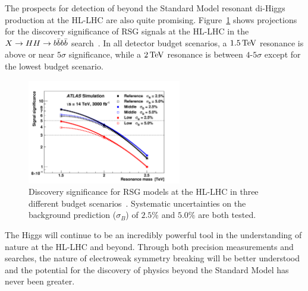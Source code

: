 The prospects for detection of beyond the Standard Model resonant di-Higgs production at the HL-LHC are also quite promising. Figure~\ref{fig:HH_prospect} shows projections for the discovery significance of RSG signals at the HL-LHC in the $X\to HH \to b\bar{b}b\bar{b}$ search~\cite{ScopingDocument}. In all detector budget scenarios, a $1.5 \TeV$ resonance is above or near $5\sigma$ significance, while a $2 \TeV$ resonance is between $4$-$5\sigma$ except for the lowest budget scenario. 
%
\begin{figure}[h!]
  \centering
  \captionsetup{justification=centering}

  \includegraphics[width=0.6\textwidth]{figures/HH_scoping}
        
   \caption{Discovery significance for RSG models at the HL-LHC in three different budget scenarios~\cite{ScopingDocument}. Systematic uncertainties on the background prediction ($\sigma_B$) of $2.5\%$ and $5.0\%$ are both tested.}
  \label{fig:HH_prospect}
\end{figure}
%

The Higgs will continue to be an incredibly powerful tool in the understanding of nature at the HL-LHC and beyond. Through both precision measurements and searches, the nature of electroweak symmetry breaking will be better understood and the potential for the discovery of physics beyond the Standard Model has never been greater. 



